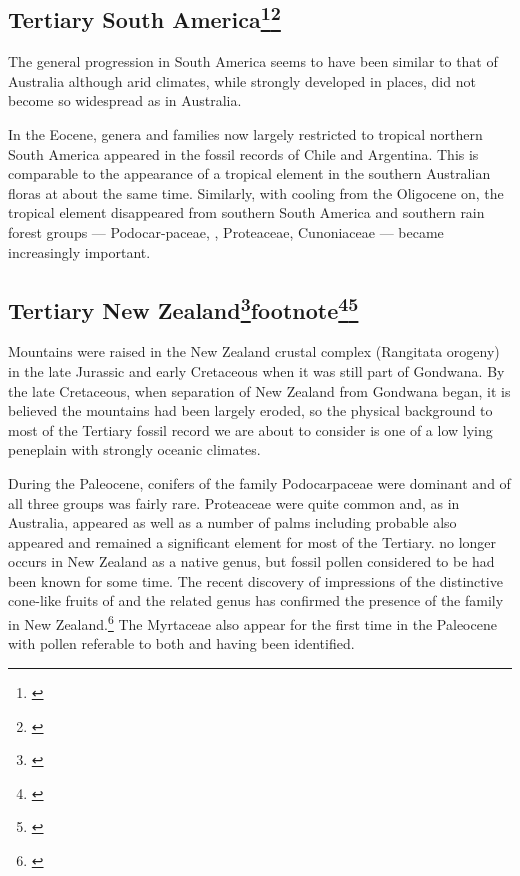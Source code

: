 \subsection[Tertiary South America]{Tertiary South America\footnote{\cite{wace1965vascular}}\footnote{\cite{kemp1978tertiary}}}

The general progression in South America seems to have been similar to that of Australia although arid climates, while strongly developed in places, did not become so widespread as in Australia.

In the Eocene, genera and families now largely restricted to tropical northern South America appeared in the fossil records of Chile and Argentina.
This is comparable to the appearance of a tropical element in the southern Australian floras at about the same time.
Similarly, with cooling from the Oligocene on, the tropical element disappeared from southern South America and southern rain forest groups --- Podocar-paceae, , Proteaceae, Cunoniaceae --- became increasingly important.

\subsection[Tertiary New Zealand]{Tertiary New Zealand\footnote{\cite{mildenhall1980new}}footnote{\cite{fleming1979geological}}\footnote{\cite{mildenhall1984palaeobotanical}}\footnote{\cite{pocknall1984late}}}

Mountains were raised in the New Zealand crustal complex (Rangitata orogeny) in the late Jurassic and early Cretaceous when it was still part of Gondwana.
By the late Cretaceous, when separation of New Zealand from Gondwana began, it is believed the mountains had been largely eroded, so the physical background to most of the Tertiary fossil record we are about to consider is one of a low lying peneplain with strongly oceanic climates.

During the Paleocene, conifers of the family Podocarpaceae were dominant and  of all three groups was fairly rare.
Proteaceae were quite common and, as in Australia,  appeared as well as a number of palms including probable  also appeared and remained a significant element for most of the Tertiary.  no longer occurs in New Zealand as a native genus, but fossil pollen considered to be  had been known for some time.
The recent discovery of impressions of the distinctive cone-like fruits of  and the related genus  has confirmed the presence of the family in New Zealand.\footnote{\cite{campbell1985megafossils}}
The Myrtaceae also appear for the first time in the Paleocene with pollen referable to both  and  having been identified.

